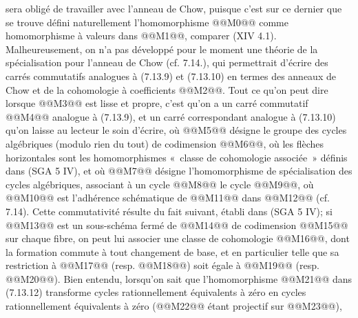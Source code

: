 
sera obligé de travailler avec l'anneau de Chow, puisque c'est sur ce dernier que se trouve défini naturellement l'homomorphisme @@M0@@ comme homomorphisme à valeurs dans @@M1@@, comparer (XIV 4.1). Malheureusement, on n'a pas développé pour le moment une théorie de la spécialisation pour l'anneau de Chow (cf. 7.14.), qui permettrait d'écrire des carrés commutatifs analogues à (7.13.9) et (7.13.10) en termes des anneaux de Chow et de la cohomologie à coefficients @@M2@@. Tout ce qu'on peut dire lorsque @@M3@@ est lisse et propre, c'est qu'on a un carré commutatif
@@M4@@
analogue à (7.13.9), et un carré correspondant analogue à (7.13.10) qu'on laisse au lecteur le soin d'écrire, où @@M5@@ désigne le groupe des cycles algébriques (modulo rien du tout) de codimension @@M6@@, où les flèches horizontales sont les homomorphismes «~classe de cohomologie associée~» définis dans (SGA 5 IV), et où @@M7@@ désigne l'homomorphisme de spécialisation des cycles algébriques, associant à un cycle @@M8@@ le cycle @@M9@@, où @@M10@@ est l'adhérence schématique de @@M11@@ dans @@M12@@ (cf. 7.14). Cette commutativité résulte du fait suivant, établi dans (SGA 5 IV); si @@M13@@ est un sous-schéma fermé de @@M14@@ de codimension @@M15@@ sur chaque fibre, on peut lui associer une classe de cohomologie @@M16@@, dont la formation commute à tout changement de base, et en particulier telle que sa restriction à @@M17@@ (resp. @@M18@@) soit égale à @@M19@@ (resp. @@M20@@). Bien entendu, lorsqu'on sait que l'homomorphisme @@M21@@ dans (7.13.12) transforme cycles rationnellement équivalents à zéro en cycles rationnellement équivalents à zéro (@@M22@@ étant projectif sur @@M23@@),
